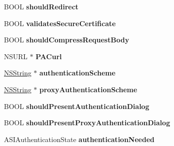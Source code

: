 \begin{DoxyCompactItemize}
\item 
\hypertarget{interface_a_s_i_h_t_t_p_request_a67392d144f0b29b4af5e478867ab7210}{
\-B\-O\-O\-L {\bfseries should\-Redirect}}
\label{interface_a_s_i_h_t_t_p_request_a67392d144f0b29b4af5e478867ab7210}

\item 
\hypertarget{interface_a_s_i_h_t_t_p_request_af4c82331697b93f1356f69e382e81dd2}{
\-B\-O\-O\-L {\bfseries validates\-Secure\-Certificate}}
\label{interface_a_s_i_h_t_t_p_request_af4c82331697b93f1356f69e382e81dd2}

\item 
\hypertarget{interface_a_s_i_h_t_t_p_request_a5caebf9227ad199bf7c5fe9439df315c}{
\-B\-O\-O\-L {\bfseries should\-Compress\-Request\-Body}}
\label{interface_a_s_i_h_t_t_p_request_a5caebf9227ad199bf7c5fe9439df315c}

\item 
\hypertarget{interface_a_s_i_h_t_t_p_request_a288caa55750fb0470a766ad46771b036}{
\-N\-S\-U\-R\-L $\ast$ {\bfseries \-P\-A\-Curl}}
\label{interface_a_s_i_h_t_t_p_request_a288caa55750fb0470a766ad46771b036}

\item 
\hypertarget{interface_a_s_i_h_t_t_p_request_af720d24bc1e2e48f8ecdd6e0b0bef1f5}{
\hyperlink{class_n_s_string}{\-N\-S\-String} $\ast$ {\bfseries authentication\-Scheme}}
\label{interface_a_s_i_h_t_t_p_request_af720d24bc1e2e48f8ecdd6e0b0bef1f5}

\item 
\hypertarget{interface_a_s_i_h_t_t_p_request_ac0a0e9653ee85171666515454fcc69f4}{
\hyperlink{class_n_s_string}{\-N\-S\-String} $\ast$ {\bfseries proxy\-Authentication\-Scheme}}
\label{interface_a_s_i_h_t_t_p_request_ac0a0e9653ee85171666515454fcc69f4}

\item 
\hypertarget{interface_a_s_i_h_t_t_p_request_a0d4ffdc7b8fab1b541a885ab3d07123f}{
\-B\-O\-O\-L {\bfseries should\-Present\-Authentication\-Dialog}}
\label{interface_a_s_i_h_t_t_p_request_a0d4ffdc7b8fab1b541a885ab3d07123f}

\item 
\hypertarget{interface_a_s_i_h_t_t_p_request_a89b7f56b45d6c2bb0d9a862025baa7e3}{
\-B\-O\-O\-L {\bfseries should\-Present\-Proxy\-Authentication\-Dialog}}
\label{interface_a_s_i_h_t_t_p_request_a89b7f56b45d6c2bb0d9a862025baa7e3}

\item 
\hypertarget{interface_a_s_i_h_t_t_p_request_a6b84e61d04187f5f9fab1054ed1e4b3a}{
\-A\-S\-I\-Authentication\-State {\bfseries authentication\-Needed}}
\label{interface_a_s_i_h_t_t_p_request_a6b84e61d04187f5f9fab1054ed1e4b3a}


\end{DoxyCompactItemize}

